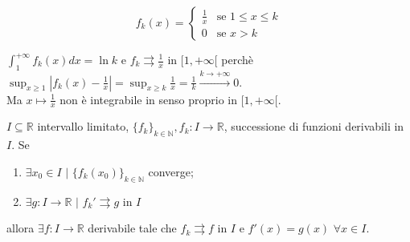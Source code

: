 \begin{equation*}
	f_k(x) =
	\begin{cases}
		\frac{1}{x} & \text{se } 1 \leq x \leq k
		\\
		0 & \text{se } x > k
	\end{cases}
\end{equation*}
\segnaposto %

$\int_{1}^{+\infty}f_k(x)dx=\ln k$ e $f_k \rightrightarrows \frac{1}{x}$ in $[1,+\infty[$ perchè $\sup_{x \geq 1}|f_k(x) -\frac{1}{x}|=\sup_{x \geq k}\frac{1}{x}=\frac{1}{k} \xrightarrow{k \rightarrow +\infty} 0$.\\
Ma $x \mapsto \frac{1}{x}$ non è integrabile in senso proprio in $[1,+\infty[$.


\begin{theorem}
	\label{th: pag 209}
	$I \subseteq \mathbb{R}$ intervallo limitato, $\{f_k\}_{k \in \mathbb{N}}, f_k: I \rightarrow \mathbb{R}$, successione di funzioni derivabili in $I$. Se 
	\begin{enumerate}
		\item $\exists x_0 \in I\,\, |\,\, \{f_k(x_0)\}_{k \in \mathbb{N}} $ converge;
		
		\item $\exists g:I \rightarrow \mathbb{R} \,\, |\,\, f_k' \rightrightarrows g$ in $I$
	\end{enumerate}
	
	allora $\exists f: I \rightarrow \mathbb{R}$ derivabile tale che $f_k\rightrightarrows f$ in $I$ e $f' (x)= g(x) \,\, \forall x \in I$.
\end{theorem}


